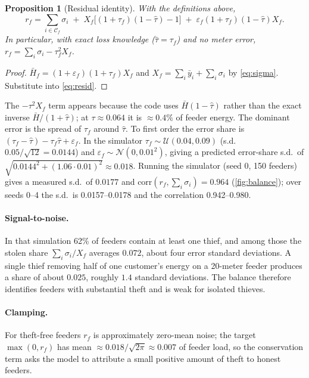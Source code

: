 \documentclass[11pt,a4paper]{article}
\theoremstyle{plain}
\newtheorem{proposition}{Proposition}
\theoremstyle{definition}
\theoremstyle{remark}
\begin{document}
\begin{proposition}[Residual identity]
\label{prop:residual}
With the definitions above,
\begin{equation}
r_f=\sum_{i\in\mathcal C_f}\sigma_i \;+\; X_f\big[(1+\tau_f)(1-\hat\tau)-1\big] \;+\; \varepsilon_f(1+\tau_f)(1-\hat\tau)X_f .
\label{eq:residid}
\end{equation}
In particular, with exact loss knowledge ($\hat\tau=\tau_f$) and no meter error, $r_f=\sum_i\sigma_i-\tau_f^2X_f$.
\end{proposition}
\begin{proof}
$\bar H_f=(1+\varepsilon_f)(1+\tau_f)X_f$ and $X_f=\sum_i\bar y_i+\sum_i\sigma_i$ by \eqref{eq:sigma}. Substitute into \eqref{eq:resid}.
\end{proof}
The $-\tau^2X_f$ term appears because the code uses $\bar H(1-\hat\tau)$ rather than the exact inverse $\bar H/(1+\hat\tau)$; at $\tau\approx0.064$ it is $\approx0.4\%$ of feeder energy. The dominant error is the spread of $\tau_f$ around $\hat\tau$. To first order the error share is $(\tau_f-\hat\tau)-\tau_f\hat\tau+\varepsilon_f$. In the simulator $\tau_f\sim\mathcal U(0.04,0.09)$ (s.d.\ $0.05/\sqrt{12}=0.0144$) and $\varepsilon_f\sim\mathcal N(0,0.01^2)$, giving a predicted error-share s.d.\ of $\sqrt{0.0144^2+(1.06\cdot0.01)^2}\approx0.018$. Running the simulator (seed 0, 150 feeders) gives a measured s.d.\ of $0.0177$ and $\mathrm{corr}(r_f,\sum_i\sigma_i)=0.964$ (\cref{fig:balance}); over seeds 0--4 the s.d.\ is 0.0157--0.0178 and the correlation 0.942--0.980.

\paragraph{Signal-to-noise.} In that simulation 62\% of feeders contain at least one thief, and among those the stolen share $\sum_i\sigma_i/X_f$ averages $0.072$, about four error standard deviations. A single thief removing half of one customer's energy on a 20-meter feeder produces a share of about $0.025$, roughly $1.4$ standard deviations. The balance therefore identifies feeders with substantial theft and is weak for isolated thieves.

\paragraph{Clamping.} For theft-free feeders $r_f$ is approximately zero-mean noise; the target $\max(0,r_f)$ has mean $\approx 0.018/\sqrt{2\pi}\approx0.007$ of feeder load, so the conservation term asks the model to attribute a small positive amount of theft to honest feeders.
\end{document}
